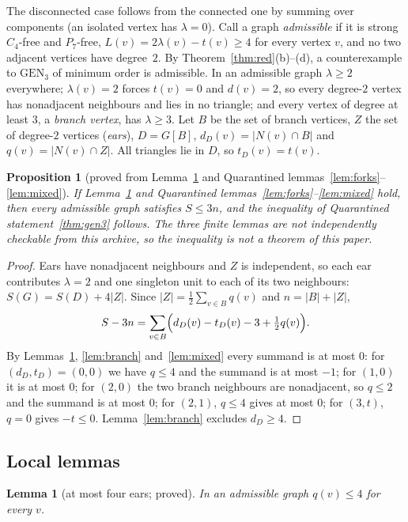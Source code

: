 \documentclass[11pt]{amsart}
\newtheorem{proposition}[theorem]{Proposition}
\newtheorem{lemma}[theorem]{Lemma}
\theoremstyle{definition}
\theoremstyle{remark}
\newcommand{\GEN}{\mathrm{GEN}}
\begin{document}
The disconnected case follows from the connected one by summing over components (an isolated vertex has $\lambda=0$). Call a graph \emph{admissible} if it is strong $C_4$-free and $P_7$-free, $L(v)=2\lambda(v)-t(v)\ge4$ for every vertex $v$, and no two adjacent vertices have degree~$2$. By Theorem~\ref{thm:red}(b)--(d), a counterexample to $\GEN_3$ of minimum order is admissible. In an admissible graph $\lambda\ge2$ everywhere; $\lambda(v)=2$ forces $t(v)=0$ and $d(v)=2$, so every degree-$2$ vertex has nonadjacent neighbours and lies in no triangle; and every vertex of degree at least $3$, a \emph{branch vertex}, has $\lambda\ge3$. Let $B$ be the set of branch vertices, $Z$ the set of degree-$2$ vertices (\emph{ears}), $D=G[B]$, $d_D(v)=|N(v)\cap B|$ and $q(v)=|N(v)\cap Z|$. All triangles lie in $D$, so $t_D(v)=t(v)$.

\begin{proposition}[proved from Lemma~\ref{lem:ears} and Quarantined lemmas~\ref{lem:forks}--\ref{lem:mixed}]\label{prop:adm}
If Lemma~\ref{lem:ears} and Quarantined lemmas~\ref{lem:forks}--\ref{lem:mixed} hold, then every admissible graph satisfies $S\le3n$, and the inequality of Quarantined statement~\ref{thm:gen3} follows. The three finite lemmas are not independently checkable from this archive, so the inequality is not a theorem of this paper.
\end{proposition}

\begin{proof}
Ears have nonadjacent neighbours and $Z$ is independent, so each ear contributes $\lambda=2$ and one singleton unit to each of its two neighbours: $S(G)=S(D)+4|Z|$. Since $|Z|=\frac12\sum_{v\in B}q(v)$ and $n=|B|+|Z|$,
\[
S-3n=\sum_{v\in B}\Bigl(d_D(v)-t_D(v)-3+\tfrac12q(v)\Bigr).
\]
By Lemmas~\ref{lem:ears}, \ref{lem:branch} and~\ref{lem:mixed} every summand is at most $0$: for $(d_D,t_D)=(0,0)$ we have $q\le4$ and the summand is at most $-1$; for $(1,0)$ it is at most $0$; for $(2,0)$ the two branch neighbours are nonadjacent, so $q\le2$ and the summand is at most $0$; for $(2,1)$, $q\le4$ gives at most $0$; for $(3,t)$, $q=0$ gives $-t\le0$. Lemma~\ref{lem:branch} excludes $d_D\ge4$.
\end{proof}

\subsection{Local lemmas}

\begin{lemma}[at most four ears; proved]\label{lem:ears}
In an admissible graph $q(v)\le4$ for every $v$.
\end{lemma}
\end{document}

